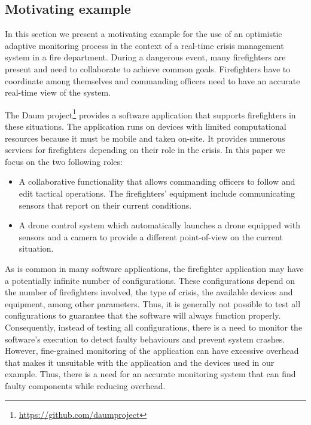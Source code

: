 \subsection{Motivating example\label{sec:motivatingexample}}

In this section we present a motivating example for the use of an optimistic adaptive monitoring process in the context of a real-time crisis management system in a fire department. 
During a dangerous event, many firefighters are present and need to collaborate to achieve common goals.
Firefighters have to coordinate among themselves and commanding officers need to have an accurate real-time view of the system.

The Daum project\footnote{\url{https://github.com/daumproject}} provides a software application that supports firefighters in these situations.
The application runs on devices with limited computational resources because it must be mobile and taken on-site.
It provides numerous services for firefighters depending on their role in the crisis. In this paper we focus on the two following roles:
\begin{itemize}
\leftskip -.2in
 \item A collaborative functionality that allows commanding officers to follow and edit tactical operations. The firefighters' equipment include communicating sensors that report on their current conditions.
 \item A drone control system which automatically launches a drone equipped with sensors and a camera to provide a different point-of-view on the current situation.
\end{itemize}


As is common in many software applications, the firefighter application may have a potentially infinite number of configurations. These configurations depend on the number of firefighters involved, the type of crisis, the available devices and equipment, among other parameters. 
Thus, it is generally not possible to test all configurations to guarantee that the software will always function properly. 
Consequently, instead of testing all configurations, there is a need to monitor the software's execution to detect faulty behaviours and prevent system crashes. 
However, fine-grained monitoring of the application can have excessive overhead that makes it unsuitable with the application and the devices used in our example.
Thus, there is a need for an accurate monitoring system that can find faulty components while reducing overhead.

